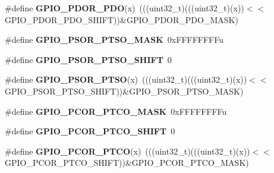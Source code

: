 \begin{DoxyCompactItemize}
\item 
\#define {\bfseries G\+P\+I\+O\+\_\+\+P\+D\+O\+R\+\_\+\+P\+DO}(x)~(((uint32\+\_\+t)(((uint32\+\_\+t)(x))$<$$<$G\+P\+I\+O\+\_\+\+P\+D\+O\+R\+\_\+\+P\+D\+O\+\_\+\+S\+H\+I\+FT))\&G\+P\+I\+O\+\_\+\+P\+D\+O\+R\+\_\+\+P\+D\+O\+\_\+\+M\+A\+SK)\hypertarget{group__GPIO__Register__Masks_ga4071beeff4d9b5c200686972dd52d855}{}\label{group__GPIO__Register__Masks_ga4071beeff4d9b5c200686972dd52d855}

\item 
\#define {\bfseries G\+P\+I\+O\+\_\+\+P\+S\+O\+R\+\_\+\+P\+T\+S\+O\+\_\+\+M\+A\+SK}~0x\+F\+F\+F\+F\+F\+F\+F\+Fu\hypertarget{group__GPIO__Register__Masks_gaa8a48e38ef70ff1ba3bbcbf31b891da4}{}\label{group__GPIO__Register__Masks_gaa8a48e38ef70ff1ba3bbcbf31b891da4}

\item 
\#define {\bfseries G\+P\+I\+O\+\_\+\+P\+S\+O\+R\+\_\+\+P\+T\+S\+O\+\_\+\+S\+H\+I\+FT}~0\hypertarget{group__GPIO__Register__Masks_ga5a962b85e07477e26afe639c7ca478cb}{}\label{group__GPIO__Register__Masks_ga5a962b85e07477e26afe639c7ca478cb}

\item 
\#define {\bfseries G\+P\+I\+O\+\_\+\+P\+S\+O\+R\+\_\+\+P\+T\+SO}(x)~(((uint32\+\_\+t)(((uint32\+\_\+t)(x))$<$$<$G\+P\+I\+O\+\_\+\+P\+S\+O\+R\+\_\+\+P\+T\+S\+O\+\_\+\+S\+H\+I\+FT))\&G\+P\+I\+O\+\_\+\+P\+S\+O\+R\+\_\+\+P\+T\+S\+O\+\_\+\+M\+A\+SK)\hypertarget{group__GPIO__Register__Masks_ga6b16f5841a5c5f20311eafc574f814e4}{}\label{group__GPIO__Register__Masks_ga6b16f5841a5c5f20311eafc574f814e4}

\item 
\#define {\bfseries G\+P\+I\+O\+\_\+\+P\+C\+O\+R\+\_\+\+P\+T\+C\+O\+\_\+\+M\+A\+SK}~0x\+F\+F\+F\+F\+F\+F\+F\+Fu\hypertarget{group__GPIO__Register__Masks_ga0b8378768ee61ea2c685a1687c90fa03}{}\label{group__GPIO__Register__Masks_ga0b8378768ee61ea2c685a1687c90fa03}

\item 
\#define {\bfseries G\+P\+I\+O\+\_\+\+P\+C\+O\+R\+\_\+\+P\+T\+C\+O\+\_\+\+S\+H\+I\+FT}~0\hypertarget{group__GPIO__Register__Masks_ga5c9203b830cbd86cd8d0189872b5c772}{}\label{group__GPIO__Register__Masks_ga5c9203b830cbd86cd8d0189872b5c772}

\item 
\#define {\bfseries G\+P\+I\+O\+\_\+\+P\+C\+O\+R\+\_\+\+P\+T\+CO}(x)~(((uint32\+\_\+t)(((uint32\+\_\+t)(x))$<$$<$G\+P\+I\+O\+\_\+\+P\+C\+O\+R\+\_\+\+P\+T\+C\+O\+\_\+\+S\+H\+I\+FT))\&G\+P\+I\+O\+\_\+\+P\+C\+O\+R\+\_\+\+P\+T\+C\+O\+\_\+\+M\+A\+SK)\hypertarget{group__GPIO__Register__Masks_ga3a9c3710923cd50fc2df4e678180eb1d}{}\label{group__GPIO__Register__Masks_ga3a9c3710923cd50fc2df4e678180eb1d}


\end{DoxyCompactItemize}
